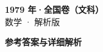 \documentclass[zihao=-4, a4paper]{ctexart}
\begin{document}
\begin{center}
  {\Large\bfseries 1979 年·全国卷（文科）}\\[4pt]
  {\large 数学 · 解析版}
\end{center}
\medskip
{}

\clearpage
{}
\begin{center}{\Large\bfseries 参考答案与详细解析}\end{center}
\medskip

\end{document}
